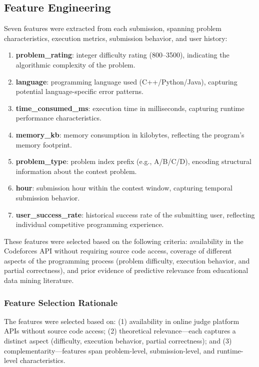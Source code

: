 \documentclass[10pt,a4paper]{article}
\begin{document}
\subsection{Feature Engineering}

Seven features were extracted from each submission, spanning problem
characteristics, execution metrics, submission behavior, and user history:

\begin{enumerate}
    \item \textbf{problem\_rating}: integer difficulty rating (800--3500),
          indicating the algorithmic complexity of the problem.
    \item \textbf{language}: programming language used (C++/Python/Java),
          capturing potential language-specific error patterns.
    \item \textbf{time\_consumed\_ms}: execution time in milliseconds,
          capturing runtime performance characteristics.
    \item \textbf{memory\_kb}: memory consumption in kilobytes, reflecting
          the program's memory footprint.
    \item \textbf{problem\_type}: problem index prefix (e.g., A/B/C/D), encoding
          structural information about the contest problem.
    \item \textbf{hour}: submission hour within the contest window, capturing
          temporal submission behavior.
    \item \textbf{user\_success\_rate}: historical success rate of the submitting
          user, reflecting individual competitive programming experience.
\end{enumerate}

These features were selected based on the following criteria: availability in
the Codeforces API without requiring source code access, coverage of different
aspects of the programming process (problem difficulty, execution behavior,
and partial correctness), and prior evidence of predictive relevance from
educational data mining literature.

\subsubsection*{Feature Selection Rationale}
The features were selected based on: (1) availability in online judge platform
APIs without source code access; (2) theoretical relevance---each captures a
distinct aspect (difficulty, execution behavior, partial correctness); and
(3) complementarity---features span problem-level, submission-level, and
runtime-level characteristics.
\end{document}
